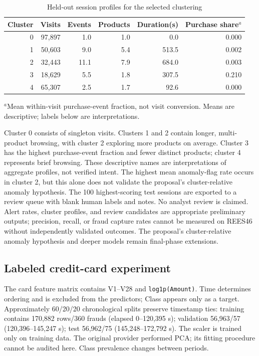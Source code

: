 \documentclass[conference]{IEEEtran}
\newcommand{\code}[1]{\texttt{\small #1}}
\begin{document}
\begin{table}[t]\centering\caption{Held-out session profiles for the selected clustering}\label{tab:clusters}\scriptsize
\begin{tabular}{rrrrrr}\toprule Cluster & Visits & Events & Products & Duration(s) & Purchase share$^a$\\\midrule
0 & 97,897 & 1.0 & 1.0 & 0.0 & 0.000 \\
1 & 50,603 & 9.0 & 5.4 & 513.5 & 0.002 \\
2 & 32,443 & 11.1 & 7.9 & 684.0 & 0.003 \\
3 & 18,629 & 5.5 & 1.8 & 307.5 & 0.210 \\
4 & 65,307 & 2.5 & 1.7 & 92.6 & 0.000 \\
\bottomrule\end{tabular}\begin{flushleft}\scriptsize $^a$Mean within-visit purchase-event fraction, not visit conversion. Means are descriptive; labels below are interpretations.\end{flushleft}\end{table}
Cluster 0 consists of singleton visits. Clusters 1 and 2 contain longer, multi-product browsing, with cluster 2 exploring more products on average. Cluster 3 has the highest purchase-event fraction and fewer distinct products; cluster 4 represents brief browsing. These descriptive names are interpretations of aggregate profiles, not verified intent. The highest mean anomaly-flag rate occurs in cluster 2, but this alone does not validate the proposal's cluster-relative anomaly hypothesis.
The 100 highest-scoring test sessions are exported to a review queue with blank human labels and notes. No analyst review is claimed. Alert rates, cluster profiles, and review candidates are appropriate preliminary outputs; precision, recall, or fraud capture rates cannot be measured on REES46 without independently validated outcomes. The proposal's cluster-relative anomaly hypothesis and deeper models remain final-phase extensions.

\subsection{Labeled credit-card experiment}
The card feature matrix contains V1--V28 and \code{log1p(Amount)}. Time determines ordering and is excluded from the predictors; Class appears only as a target. Approximately 60/20/20 chronological splits preserve timestamp ties: training contains 170,882 rows/360 frauds (elapsed 0--120,395 s); validation 56,963/57 (120,396--145,247 s); test 56,962/75 (145,248--172,792 s). The scaler is trained only on training data. The original provider performed PCA; its fitting procedure cannot be audited here. Class prevalence changes between periods.
\end{document}
